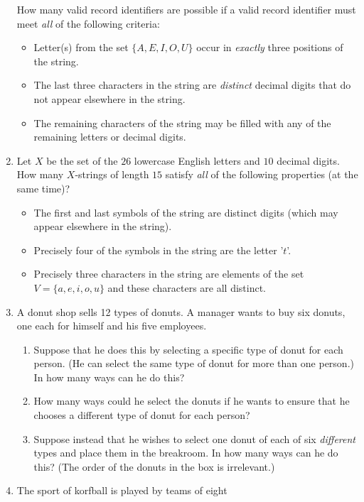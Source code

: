 \begin{enumerate}
    How many valid record identifiers are possible if a valid record
    identifier must meet \emph{all} of the following criteria:
    \begin{itemize}
    \item Letter(s) from the set $\{A,E,I,O,U\}$ occur in
      \emph{exactly} three positions of the string.
    \item The last three characters in the string are \emph{distinct}
      decimal digits that do not appear elsewhere in the string.
    \item The remaining characters of the string may be filled with
      any of the remaining letters or decimal digits.
    \end{itemize}
  \item Let $X$ be the set of the $26$ lowercase English letters and
    $10$ decimal digits. How many $X$-strings of length $15$
    satisfy \emph{all} of the following properties (at the same time)?
    \begin{itemize}
    \item The first and last symbols of the string are distinct digits
      (which may appear elsewhere in the string).
    \item Precisely four of the symbols in the string are the letter '$t$'.
    \item Precisely three characters in the string are elements of the
      set $V=\{a,e,i,o,u\}$ and these characters are all distinct.
    \end{itemize}
  \item A donut shop sells 12 types of donuts. A manager wants to buy
    six donuts, one each for himself and his five employees.
    \begin{enumerate}
    \item Suppose that he does this by selecting a specific type of
      donut for each person. (He can select the same type of donut for
      more than one person.) In how many ways can he do this?
    \item How many ways could he select the donuts if he wants to
      ensure that he chooses a different type of donut for each
      person?
    \item Suppose instead that he wishes to select one donut of each
      of six \emph{different} types and place them in the
      breakroom. In how many ways can he do this? (The order of the
      donuts in the box is irrelevant.)
    \end{enumerate}
  \item The sport of korfball is played by teams of eight

\end{enumerate}
